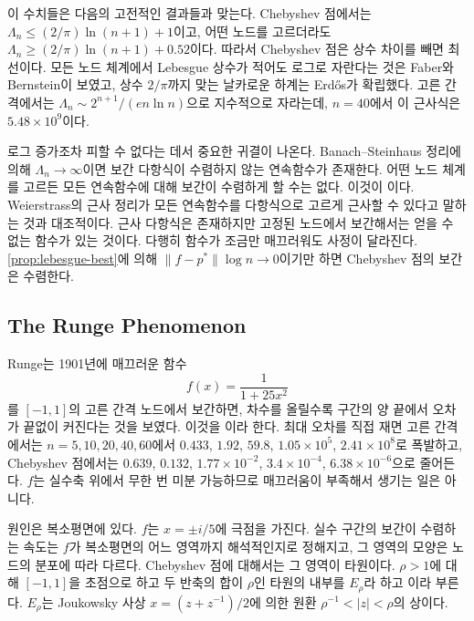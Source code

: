 이 수치들은 다음의 고전적인 결과들과 맞는다\cite{trefethen2019atap,brutman1997}. Chebyshev 점에서는 $\Lambda_n\le(2/\pi)\ln(n+1)+1$이고, 어떤 노드를 고르더라도 $\Lambda_n\ge(2/\pi)\ln(n+1)+0.52$이다. 따라서 Chebyshev 점은 상수 차이를 빼면 최선이다. 모든 노드 체계에서 Lebesgue 상수가 적어도 로그로 자란다는 것은 Faber와 Bernstein이 보였고, 상수 $2/\pi$까지 맞는 날카로운 하계는 Erdős가 확립했다\cite{erdos1961}. 고른 간격에서는 $\Lambda_n\sim2^{n+1}/(en\ln n)$으로 지수적으로 자라는데\cite{schonhage1961}, $n=40$에서 이 근사식은 $5.48\times10^9$이다.

로그 증가조차 피할 수 없다는 데서 중요한 귀결이 나온다. Banach--Steinhaus 정리에 의해 $\Lambda_n\to\infty$이면 보간 다항식이 수렴하지 않는 연속함수가 존재한다. 어떤 노드 체계를 고르든 모든 연속함수에 대해 보간이 수렴하게 할 수는 없다. 이것이 이다\cite{faber1914}. Weierstrass의 근사 정리\cite{weierstrass1885}가 모든 연속함수를 다항식으로 고르게 근사할 수 있다고 말하는 것과 대조적이다. 근사 다항식은 존재하지만 고정된 노드에서 보간해서는 얻을 수 없는 함수가 있는 것이다. 다행히 함수가 조금만 매끄러워도 사정이 달라진다. \cref{prop:lebesgue-best}에 의해 $\|f-p^\ast\|\log n\to0$이기만 하면 Chebyshev 점의 보간은 수렴한다.

\subsection{The Runge Phenomenon}

Runge는 1901년에 매끄러운 함수
\[
f(x)=\frac1{1+25x^2}
\]
를 $[-1,1]$의 고른 간격 노드에서 보간하면, 차수를 올릴수록 구간의 양 끝에서 오차가 끝없이 커진다는 것을 보였다\cite{runge1901}. 이것을 이라 한다. 최대 오차를 직접 재면 고른 간격에서는 $n=5,10,20,40,60$에서 $0.433$, $1.92$, $59.8$, $1.05\times10^5$, $2.41\times10^8$로 폭발하고, Chebyshev 점에서는 $0.639$, $0.132$, $1.77\times10^{-2}$, $3.4\times10^{-4}$, $6.38\times10^{-6}$으로 줄어든다. $f$는 실수축 위에서 무한 번 미분 가능하므로 매끄러움이 부족해서 생기는 일은 아니다.

원인은 복소평면에 있다. $f$는 $x=\pm i/5$에 극점을 가진다. 실수 구간의 보간이 수렴하는 속도는 $f$가 복소평면의 어느 영역까지 해석적인지로 정해지고, 그 영역의 모양은 노드의 분포에 따라 다르다. Chebyshev 점에 대해서는 그 영역이 타원이다. $\rho>1$에 대해 $[-1,1]$을 초점으로 하고 두 반축의 합이 $\rho$인 타원의 내부를 $E_\rho$라 하고 이라 부른다. $E_\rho$는 Joukowsky 사상 $x=(z+z^{-1})/2$에 의한 원환 $\rho^{-1}<|z|<\rho$의 상이다.

